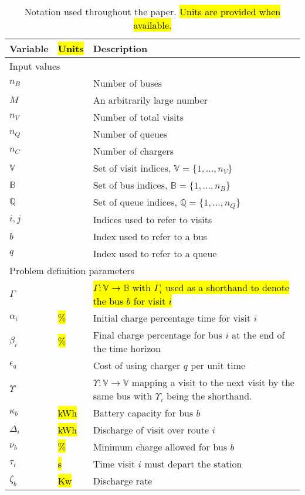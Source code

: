 \documentclass[utf8]{FrontiersinHarvard}
\begin{document}
\begin{table}[!htpb]
  \caption{Notation used throughout the paper. \hl{Units are provided when available.}}
  \label{tab:variables}
  \centering
  \begin{tabularx}{\textwidth}{l l l}
    \toprule \textbf{Variable} & \hl{\textbf{Units}} & \textbf{Description} \\ \toprule \multicolumn{3}{l}{Input values}
    \\ \hline $n_B$ & & Number of buses \\ $M$ & & An arbitrarily large number \\ $n_V$ & & Number of total visits
    \\ $n_Q$ & & Number of queues \\ $n_C$ & & Number of chargers \\ $\mathbb{V}$ & & Set of visit indices, $\mathbb{V}
    = \{1, ..., n_V\}$ \\ $\mathbb{B}$ & & Set of bus indices, $\mathbb{B} = \{1, ..., n_B\}$ \\ $\mathbb{Q}$ & & Set of
    queue indices, $\mathbb{Q} = \{1, ..., n_Q\}$ \\ $i,j$ & & Indices used to refer to visits \\ $b$ & & Index used to
    refer to a bus \\ $q$ & & Index used to refer to a queue \\ \hline \multicolumn{3}{l}{Problem definition parameters}
    \\ \hline $\Gamma$ & & \hl{$\Gamma: \mathbb{V} \rightarrow \mathbb{B}$ with $\Gamma_i$ used as a shorthand to denote
      the bus $b$ for visit $i$} \\ $\alpha_i$ & \hl{$\%$} & Initial charge percentage time for visit $i$ \\ $\beta_i$ &
    \hl{$\%$} & Final charge percentage for bus $i$ at the end of the time horizon \\ $\epsilon_q$ & & Cost of using
    charger $q$ per unit time \\ $\Upsilon$ & & $\Upsilon: \mathbb{V} \rightarrow \mathbb{V}$ mapping a visit to the
    next visit by the same bus with $\Upsilon_i$ being the shorthand. \\ $\kappa_b$ & \hl{kWh} & Battery capacity for
    bus $b$ \\ $\Delta_i$ & \hl{kWh} & Discharge of visit over route $i$ \\ $\nu_b$ & \hl{$\%$} & Minimum charge allowed
    for bus $b$ \\ $\tau_i$ & \hl{s} & Time visit $i$ must depart the station \\ $\zeta_b$ & \hl{Kw} & Discharge rate

\end{tabularx}
\end{table}
\end{document}
